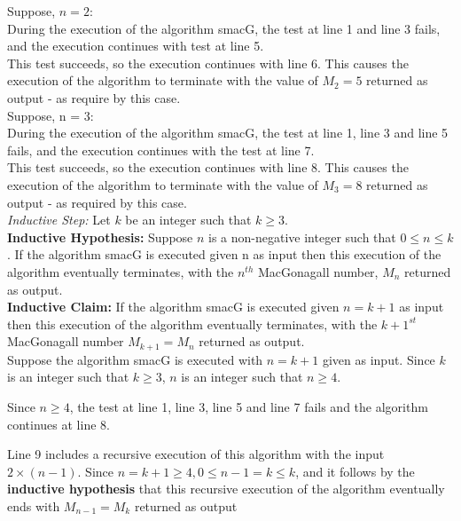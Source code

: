 \documentclass{article}
\begin{document}
\begin{enumerate}
    Suppose, $n = 2$: \\ During the execution of the algorithm smacG, the test at line 1 and line 3 fails, and the execution continues with test at line 5. \\ This test succeeds, so the execution continues with line 6. This causes the execution of the algorithm to terminate with the value of $M_2 = 5$ returned as output - as require by this case. \\ 
    
    Suppose, n = 3: \\ During the execution of the algorithm smacG, the test at line 1, line 3 and line 5 fails, and the execution continues with the test at line 7. \\ This test succeeds, so the execution continues with line 8. This causes the execution of the algorithm to terminate with the value of $M_3 = 8$ returned as output - as required by this case. \\ 
    
    \textit{Inductive Step: } Let $k$ be an integer such that $k \geq 3$. \\
    
    \textbf{Inductive Hypothesis: } Suppose $n$ is a non-negative integer such that $ 0 \leq n \leq k$. If the algorithm smacG is executed given n as input then this execution of the algorithm eventually terminates, with the $n^{th}$ MacGonagall number, $M_n$ returned as output. \\
    
    \textbf{Inductive Claim: } If the algorithm smacG is executed given $n = k + 1$ as input then this execution of the algorithm eventually terminates, with the $k+1^{st}$ MacGonagall number $M_{k+1} = M_n$ returned as output. \\
    
    Suppose the algorithm smacG is executed with $n= k + 1$ given as input. Since $k$ is an integer such that $k \geq 3$, $n$ is an integer such that $n \geq 4$.
    
    Since $n \geq 4$, the test at line 1, line 3, line 5 and line 7 fails and the algorithm continues at line 8. 
    
    Line 9 includes a recursive execution of this algorithm with the input $2 \times (n-1)$. Since $n = k + 1 \geq 4, 0 \leq n-1 = k \leq k$, and it follows by the \textbf{inductive hypothesis} that this recursive execution of the algorithm eventually ends with $M_{n-1} = M_k$ returned as output
    

\end{enumerate}
\end{document}
